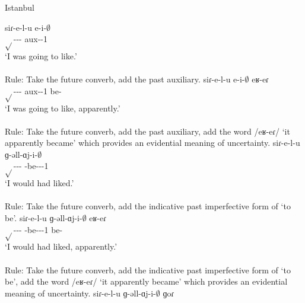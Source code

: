 \begin{adjarianpage}\label{page:254}\end{adjarianpage}%





\begin{exe}
	\ex Istanbul \label{sent:Istanbul:morpho:verb:complex:futcvb:pst}
	\begin{xlist}
		\ex \gll siɾ-e-l-u e-i-$\emptyset$ \\
		$\sqrt{}$-{\thgloss}-{\infgloss}-{\futcvb} {aux}-{\pst}-1{\sg} \\
		\trans `I was going to like.' \\
		 \\
		Rule: Take the future converb, add the past auxiliary.
		\ex \gll siɾ-e-l-u e-i-$\emptyset$ eʁ-eɾ \\
		$\sqrt{}$-{\thgloss}-{\infgloss}-{\futcvb} {aux}-{\pst}-1{\sg} be-{\eptcp} \\
		\trans `I was going to like, apparently.' \\
		 \\
		Rule: Take the future converb, add the past auxiliary, add the word /eʁ-eɾ/ `it apparently became' which provides an evidential meaning of uncertainty.
		\ex \gll siɾ-e-l-u ɡ-əll-ɑj-i-$\emptyset$ \\
		$\sqrt{}$-{\thgloss}-{\infgloss}-{\futcvb} {\ind}-be-{\thgloss}-{\pst}-1{\sg} \\
		\trans `I would had liked.' \\
		 \\
		Rule: Take the future converb, add the indicative past imperfective form of `to be'.
		\ex \gll siɾ-e-l-u ɡ-əll-ɑj-i-$\emptyset$ eʁ-eɾ \\
		$\sqrt{}$-{\thgloss}-{\infgloss}-{\futcvb} {\ind}-be-{\thgloss}-{\pst}-1{\sg} be-{\eptcp} \\
		\trans `I would had liked, apparently.' \\
		 \\
		Rule: Take the future converb, add the indicative past imperfective form of `to be', add the word /eʁ-eɾ/ `it apparently became' which provides an evidential meaning of uncertainty.
		\ex \gll siɾ-e-l-u ɡ-əll-ɑj-i-$\emptyset$ ɡoɾ \\

\end{xlist}
\end{exe}
